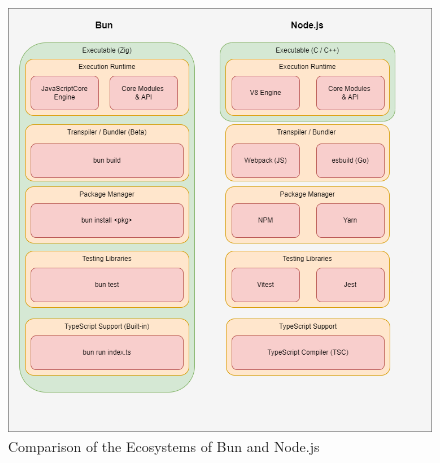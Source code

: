 \begin{figure}[H]
	\centering
	\includegraphics[width=\linewidth]{./images/EcosystemBunvsNode.png}
	\caption{Comparison of the Ecosystems of Bun and Node.js}
	\label{fig:ecosystemComparison}
\end{figure}

